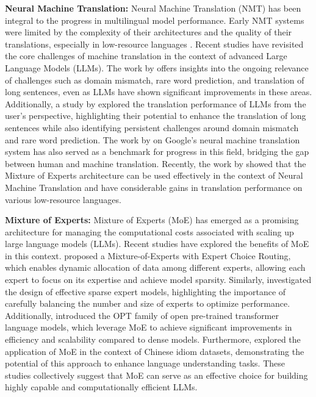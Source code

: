 \documentclass{article}
\begin{document}
\textbf{Neural Machine Translation:} Neural Machine Translation (NMT) has been integral to the progress in multilingual model performance. Early NMT systems were limited by the complexity of their architectures and the quality of their translations, especially in low-resource languages \citep{wu2019google}. Recent studies have revisited the core challenges of machine translation in the context of advanced Large Language Models (LLMs). The work by \citet{koehn2017six} offers insights into the ongoing relevance of challenges such as domain mismatch, rare word prediction, and translation of long sentences, even as LLMs have shown significant improvements in these areas. Additionally, a study by \citet{son2023translation} explored the translation performance of LLMs from the user's perspective, highlighting their potential to enhance the translation of long sentences while also identifying persistent challenges around domain mismatch and rare word prediction. The work by \citet{wu2016google} on Google's neural machine translation system has also served as a benchmark for progress in this field, bridging the gap between human and machine translation. Recently, the work by \citet{costa2022no} showed that the Mixture of Experts architecture can be used effectively in the context of Neural Machine Translation and have considerable gains in translation performance on various low-resource languages. 


\textbf{Mixture of Experts:} Mixture of Experts (MoE) has emerged as a promising architecture for managing the computational costs associated with scaling up large language models (LLMs). Recent studies have explored the benefits of MoE in this context. \citet{zhou2022mixture} proposed a Mixture-of-Experts with Expert Choice Routing, which enables dynamic allocation of data among different experts, allowing each expert to focus on its expertise and achieve model sparsity. Similarly, \citet{zoph2022designing} investigated the design of effective sparse expert models, highlighting the importance of carefully balancing the number and size of experts to optimize performance. Additionally, \citet{ott2022opt} introduced the OPT family of open pre-trained transformer language models, which leverage MoE to achieve significant improvements in efficiency and scalability compared to dense models. Furthermore, \citet{zheng2019chid} explored the application of MoE in the context of Chinese idiom datasets, demonstrating the potential of this approach to enhance language understanding tasks. These studies collectively suggest that MoE can serve as an effective choice for building highly capable and computationally efficient LLMs.
\end{document}
